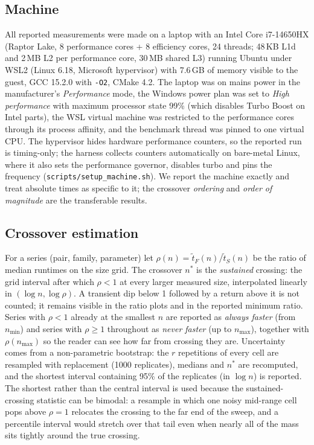 \subsection{Machine}
All reported measurements were made on a laptop with an Intel Core
i7-14650HX (Raptor Lake, 8 performance cores + 8 efficiency cores, 24
threads; 48\,KB L1d and 2\,MB L2 per performance core, 30\,MB shared L3)
running Ubuntu under WSL2 (Linux 6.18, Microsoft hypervisor) with 7.6\,GB of
memory visible to the guest, GCC 15.2.0 with \texttt{-O2}, CMake 4.2. The
laptop was on mains power in the manufacturer's \emph{Performance} mode, the
Windows power plan was set to \emph{High performance} with maximum processor
state 99\% (which disables Turbo Boost on Intel parts), the WSL virtual
machine was restricted to the performance cores through its process
affinity, and the benchmark thread was pinned to one virtual CPU. The hypervisor hides
hardware performance counters, so the reported run is timing-only; the
harness collects counters automatically on bare-metal Linux, where it also
sets the performance governor, disables turbo and pins the frequency
(\texttt{scripts/setup\_machine.sh}). We report the machine exactly and treat
absolute times as specific to it; the crossover \emph{ordering} and
\emph{order of magnitude} are the transferable results.

\subsection{Crossover estimation}
For a series (pair, family, parameter) let $\rho(n)=\tilde t_F(n)/\tilde t_S(n)$
be the ratio of median runtimes on the size grid. The crossover $n^*$ is the
\emph{sustained} crossing: the grid interval after which $\rho<1$ at every
larger measured size, interpolated linearly in $(\log n,\log\rho)$. A
transient dip below 1 followed by a return above it is not counted; it remains
visible in the ratio plots and in the reported minimum ratio. Series with $\rho<1$ already at the smallest $n$ are
reported as \emph{always faster} (from $n_{\min}$) and series with $\rho\ge1$
throughout as \emph{never faster} (up to $n_{\max}$), together with
$\rho(n_{\max})$ so the reader can see how far from crossing they are.
Uncertainty comes from a non-parametric bootstrap: the $r$ repetitions of every
cell are resampled with replacement (1000 replicates), medians and $n^*$ are
recomputed, and the shortest interval containing 95\% of the replicates (in
$\log n$) is reported. The shortest rather than the central interval is used
because the sustained-crossing statistic can be bimodal: a resample in which
one noisy mid-range cell pops above $\rho=1$ relocates the crossing to the far
end of the sweep, and a percentile interval would stretch over that tail even
when nearly all of the mass sits tightly around the true crossing.

